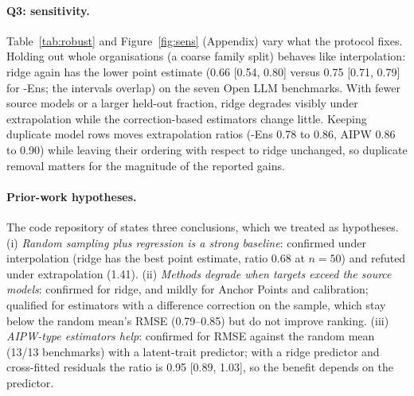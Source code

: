 \paragraph{Q3: sensitivity.}
Table~\ref{tab:robust} and Figure~\ref{fig:sens} (Appendix) vary what the protocol fixes. Holding out whole organisations (a coarse family split) behaves like interpolation: ridge again has the lower point estimate (0.66 [0.54, 0.80] versus 0.75 [0.71, 0.79] for \mass{}-Ens; the intervals overlap) on the seven Open LLM benchmarks. With fewer source models or a larger held-out fraction, ridge degrades visibly under extrapolation while the correction-based estimators change little. Keeping duplicate model rows moves extrapolation ratios (\mass{}-Ens 0.78 to 0.86, AIPW 0.86 to 0.90) while leaving their ordering with respect to ridge unchanged, so duplicate removal matters for the magnitude of the reported gains.

\begin{table}[t]
\caption{Robustness of RMSE ratio to the random mean ($n=100$, 10 repetitions, geometric mean over the benchmarks run). ``dups kept'': exact duplicate model rows not removed. Family-out: Open LLM benchmarks only.}
\label{tab:robust}
\centering\scriptsize
\resizebox{\linewidth}{!}{}
\end{table}

\paragraph{Prior-work hypotheses.}
The code repository of \citet{zhang2025benchmark} states three conclusions, which we treated as hypotheses. (i) \emph{Random sampling plus regression is a strong baseline}: confirmed under interpolation (ridge has the best point estimate, ratio 0.68 at $n=50$) and refuted under extrapolation (1.41). (ii) \emph{Methods degrade when targets exceed the source models}: confirmed for ridge, and mildly for Anchor Points and calibration; qualified for estimators with a difference correction on the sample, which stay below the random mean's RMSE (0.79--0.85) but do not improve ranking. (iii) \emph{AIPW-type estimators help}: confirmed for RMSE against the random mean (13/13 benchmarks) with a latent-trait predictor; with a ridge predictor and cross-fitted residuals the ratio is 0.95 [0.89, 1.03], so the benefit depends on the predictor.
